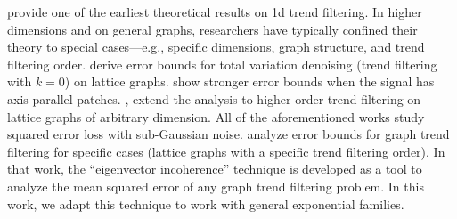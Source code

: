 \documentclass[ejs,noshowframe]{imsart}
\theoremstyle{plain}
\theoremstyle{definition}
\begin{document}
\cite{mammen1997locally} provide one of the earliest theoretical results on 1d trend filtering.
In higher dimensions and on general graphs, researchers have typically confined their theory to special cases---e.g., specific
dimensions, graph structure, and trend filtering order.
\cite{hutter2016optimal,sadhanala2016total} derive error bounds for total
variation denoising (trend filtering with $k=0$) on lattice graphs.
\cite{chatterjee2021newrisk,ortelli2020adaptive} show stronger error bounds when
the signal has axis-parallel patches. \cite{SadhanalaWang2017,
  sadhanala2021multivariate}, extend the analysis to higher-order trend
filtering on lattice graphs of arbitrary dimension.
All of the aforementioned works study squared error loss with sub-Gaussian noise.
\citet{WangSharpnack2016} analyze error bounds for graph trend filtering for specific cases
(lattice graphs with a specific trend filtering order). In that work, the
``eigenvector incoherence'' technique is developed as a tool to analyze the
mean squared error of any graph trend filtering problem.
In this work, we adapt this technique to work with general exponential families.




\end{document}
